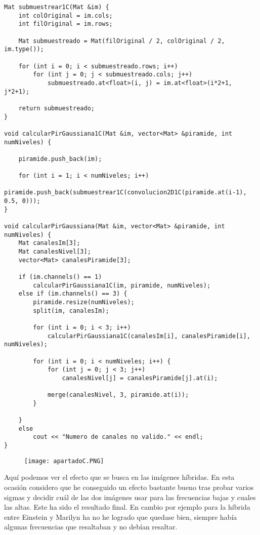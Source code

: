 \documentclass[10pt,a4paper]{article}
\begin{document}
\begin{lstlisting}
Mat submuestrear1C(Mat &im) {
	int colOriginal = im.cols;
	int filOriginal = im.rows;

	Mat submuestreado = Mat(filOriginal / 2, colOriginal / 2, im.type());

	for (int i = 0; i < submuestreado.rows; i++)
		for (int j = 0; j < submuestreado.cols; j++)
			submuestreado.at<float>(i, j) = im.at<float>(i*2+1, j*2+1);

	return submuestreado;
}

void calcularPirGaussiana1C(Mat &im, vector<Mat> &piramide, int numNiveles) {

	piramide.push_back(im);

	for (int i = 1; i < numNiveles; i++)
		piramide.push_back(submuestrear1C(convolucion2D1C(piramide.at(i-1), 0.5, 0)));
}

void calcularPirGaussiana(Mat &im, vector<Mat> &piramide, int numNiveles) {
	Mat canalesIm[3];
	Mat canalesNivel[3];
	vector<Mat> canalesPiramide[3];

	if (im.channels() == 1) 
		calcularPirGaussiana1C(im, piramide, numNiveles);	
	else if (im.channels() == 3) {
		piramide.resize(numNiveles);
		split(im, canalesIm);

		for (int i = 0; i < 3; i++)
			calcularPirGaussiana1C(canalesIm[i], canalesPiramide[i], numNiveles);		

		for (int i = 0; i < numNiveles; i++) {
			for (int j = 0; j < 3; j++)
				canalesNivel[j] = canalesPiramide[j].at(i);

			merge(canalesNivel, 3, piramide.at(i));
		}

	}
	else
		cout << "Numero de canales no valido." << endl;
}
\end{lstlisting}

\begin{figure}[H]
\centering
\texttt{[image: apartadoC.PNG]}
\end{figure}

Aquí podemos ver el efecto que se busca en las imágenes híbridas. En esta ocasión considero que he conseguido un efecto bastante bueno tras probar varios sigmas y decidir cuál de las dos imágenes usar para las frecuencias bajas y cuales las altas. Este ha sido el resultado final. En cambio por ejemplo para la híbrida entre Einstein y Marilyn ha no he logrado que quedase bien, siempre había algunas frecuencias que resaltaban y no debían resaltar.\\
\end{document}

